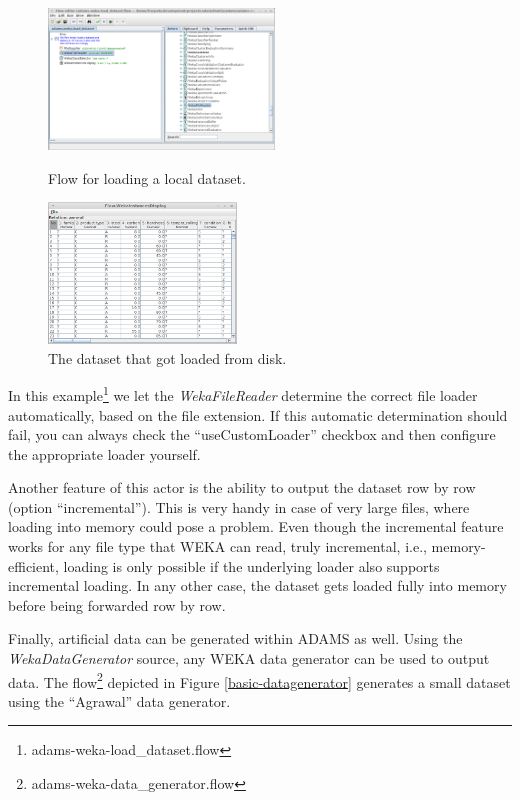 \begin{figure}[ht]
  \begin{minipage}[t]{0.5\linewidth}
    \centering
    \includegraphics[width=6.0cm]{images/basic-load_local_dataset.png}
    \caption{Flow for loading a local dataset.}
    \label{basic-load_local_dataset}
  \end{minipage}
  \hspace{0.5cm}
  \begin{minipage}[t]{0.5\linewidth}
    \centering
    \includegraphics[width=5.0cm]{images/basic-load_local_dataset-output.png}
    \caption{The dataset that got loaded from disk.}
    \label{basic-load_local_dataset-output}
  \end{minipage}
\end{figure}

In this example\footnote{adams-weka-load\_dataset.flow} we let the
\textit{WekaFileReader} determine the correct file loader automatically, based
on the file extension. If this automatic determination should fail, you can
always check the ``useCustomLoader'' checkbox and then configure the appropriate
loader yourself.

Another feature of this actor is the ability to output the dataset row by row
(option ``incremental''). This is very handy in case of very large files, where
loading into memory could pose a problem. Even though the incremental feature
works for any file type that WEKA can read, truly incremental, i.e.,
memory-efficient, loading is only possible if the underlying loader also
supports incremental loading. In any other case, the dataset gets loaded fully
into memory before being forwarded row by row.

Finally, artificial data can be generated within ADAMS as well. Using the
\textit{WekaDataGenerator} source, any WEKA data generator can be used to output
data. The flow\footnote{adams-weka-data\_generator.flow} depicted in Figure
\ref{basic-datagenerator} generates a small dataset using the ``Agrawal'' data
generator.

